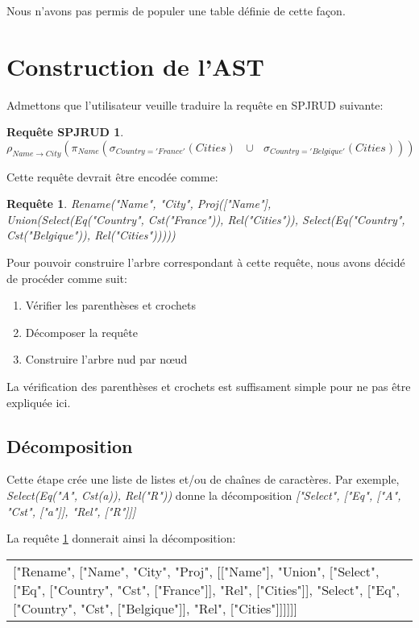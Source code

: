 \documentclass[]{article}
\newtheorem{SPJRUDRequest}{Requ\^ete SPJRUD}
\newtheorem{request}{Requ\^ete}
\begin{document}
Nous n'avons pas permis de populer une table d\'efinie de cette fa\c{c}on.

\section{Construction de l'AST}

Admettons que l'utilisateur veuille traduire la requ\^ete en SPJRUD suivante:

\begin{SPJRUDRequest}
$\rho_{Name \to City}(\pi_{Name}(\sigma_{Country='France'}(Cities) \text{ } \cup \text{ } \sigma_{Country='Belgique'}(Cities)))$
\end{SPJRUDRequest}

Cette requ\^ete devrait \^etre encod\'ee comme:

\begin{request}\label{request1}
Rename("Name", "City", Proj(["Name"], Union(Select(Eq("Country", Cst("France")), Rel("Cities")), Select(Eq("Country", Cst("Belgique")), Rel("Cities")))))
\end{request}

Pour pouvoir construire l'arbre correspondant \`a cette requ\^ete, nous avons d\'ecid\'e de proc\'eder comme suit:

\begin{enumerate}
	\item V\'erifier les parenth\`eses et crochets
	\item D\'ecomposer la requ\^ete
	\item Construire l'arbre n\œ{}ud par nœ{}ud
\end{enumerate}

La v\'erification des parenth\`eses et crochets est suffisament simple pour ne pas \^etre expliqu\'ee ici.

\subsection{D\'ecomposition}
Cette \'etape cr\'ee une liste de listes et/ou de chaînes de caract\`eres. Par exemple, \textit{Select(Eq("A", Cst(a)), Rel("R"))} donne la d\'ecomposition \textit{["Select", ["Eq", ["A", "Cst", ["a"]], "Rel", ["R"]]]}

La requ\^ete \ref{request1} donnerait ainsi la d\'ecomposition:

\begin{center}
	\begin{tabular}{p{250px}}
		["Rename", ["Name", "City", "Proj", [["Name"], "Union", ["Select", ["Eq", ["Country", "Cst", ["France"]], "Rel", ["Cities"]], "Select", ["Eq", ["Country", "Cst", ["Belgique"]], "Rel", ["Cities"]]]]]]
	\end{tabular}
\end{center}
\end{document}
